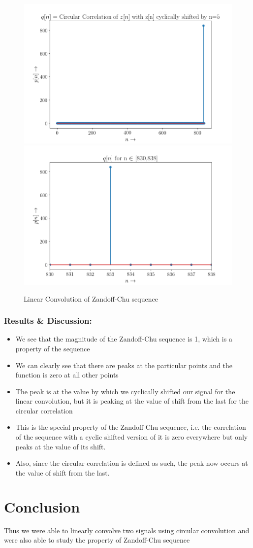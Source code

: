 \documentclass[11pt, a4paper]{article}
\begin{document}
\begin{figure}[!tbh]
  \centering
  \includegraphics[scale=0.6]{./../Extras/a10-15.png}  
  \includegraphics[scale=0.6]{./../Extras/a10-16.png}  
  \caption{Linear Convolution of Zandoff-Chu sequence}
\end{figure}
\newpage
\subsubsection{Results \& Discussion:}\label{results-discussion}
\begin{itemize}
  \item We see that the magnitude of the Zandoff-Chu sequence is 1, which is a property of the sequence
  \item We can clearly see that there are peaks at the particular points and the function is zero at all other points
  \item The peak is at the value by which we cyclically shifted our signal for the linear convolution, but it is peaking at the value of shift from the last for the circular correlation
  \item This is the special property of the Zandoff-Chu sequence, i.e. the correlation of the sequence with a cyclic shifted version of it is zero everywhere but only peaks at the value of its shift.
  \item Also, since the circular correlation is defined as such,  the peak now occurs at the value of shift from the last.
\end{itemize}
\section{Conclusion}
  Thus we were able to linearly convolve two signals using circular convolution and were also able to study the property of Zandoff-Chu sequence
\end{document}
